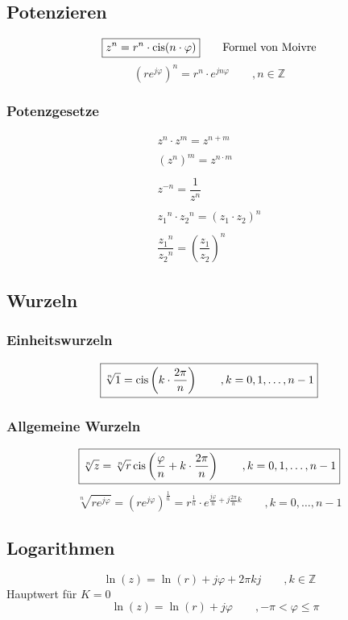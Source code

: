 \subsection{Potenzieren}
\[ \boxed{z^n = r^n \cdot \operatorname{cis}(n \cdot \varphi)} 
\qquad \text{Formel von Moivre} \]
\[ \boxed{\left( r e^{j \varphi} \right)^n = r^n \cdot e^{j n \varphi} 
\qquad , n \in \mathbb{Z}} \]

\subsubsection{Potenzgesetze}
\[ \boxed{\begin{array}{l}
z^n \cdot z^m = z^{n +m}\\\\
{(z^n)}^m = z^{n \cdot m}\\\\
z^{-n} = \dfrac{1}{z^n}\\\\
{z_1}^n \cdot {z_2}^n = (z_1 \cdot z_2)^n\\\\
\dfrac{{z_1}^n}{{z_2}^n} = \left(\dfrac{z_1}{z_2}\right)^n
\end{array}} \]

\subsection{Wurzeln}

\subsubsection{Einheitswurzeln}
\[ \boxed{\sqrt[n]{1} = \operatorname{cis}\left(k \cdot \frac{2 \pi}{n}\right) 
\qquad , k = 0, 1, \ldots, n-1} \]

\subsubsection{Allgemeine Wurzeln}
\[ \boxed{\sqrt[n]{z} 
= \sqrt[n]{r}\operatorname{cis}\left(\frac{\varphi}{n} + k \cdot \frac{2 \pi}{n}\right) 
\qquad , k = 0, 1, \ldots, n-1} \]
\[ \boxed{\sqrt[n]{r e^{j \varphi}} 
= \left( r e^{j \varphi} \right)^{\frac{1}{n}} 
= r^{\frac{1}{n}} \cdot e^{\frac{j \varphi}{n} + j \frac{2 \pi}{n}k} 
\qquad , k = 0,\ldots, n - 1} \]

\subsection{Logarithmen}
\[ \boxed{\ln(z) = \ln(r) + j \varphi + 2 \pi k j \qquad , k \in \mathbb{Z}} \]
Hauptwert für $K = 0$
\[ \boxed{\quad \ln(z) = \ln(r) + j \varphi 
\qquad , -\pi < \varphi \leq \pi} \]
